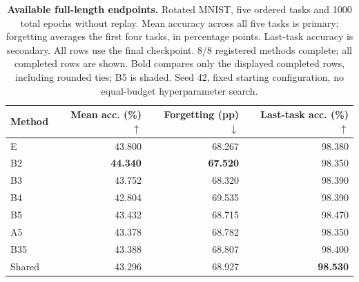 \begin{table}[!htbp]
\centering
\caption{\textbf{Available full-length endpoints.} Rotated MNIST, five ordered tasks and 1000 total epochs without replay. Mean accuracy across all five tasks is primary; forgetting averages the first four tasks, in percentage points. Last-task accuracy is secondary. All rows use the final checkpoint. 8/8 registered methods complete; all completed rows are shown. Bold compares only the displayed completed rows, including rounded ties; B5 is shaded. Seed 42, fixed starting configuration, no equal-budget hyperparameter search.}
\label{tab:revision-retention-audit}
\footnotesize\setlength{\tabcolsep}{5pt}\renewcommand{\arraystretch}{1.12}
\begin{tabular}{lrrr}
\toprule
Method & Mean acc. (\%) $\uparrow$ & Forgetting (pp) $\downarrow$ & Last-task acc. (\%) $\uparrow$ \\
\midrule
E & 43.800 & 68.267 & 98.380 \\
B2 & \textbf{44.340} & \textbf{67.520} & 98.350 \\
B3 & 43.752 & 68.320 & 98.390 \\
B4 & 42.804 & 69.535 & 98.390 \\
\rowcolor{oursbg}
B5 & 43.432 & 68.715 & 98.470 \\
A5 & 43.378 & 68.782 & 98.350 \\
B35 & 43.388 & 68.807 & 98.400 \\
Shared & 43.296 & 68.927 & \textbf{98.530} \\
\bottomrule
\end{tabular}
\end{table}
